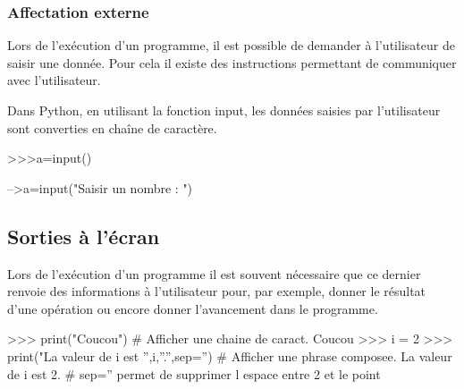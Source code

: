 \documentclass[10pt,fleqn]{article} %
\begin{document}
\subsubsection{Affectation externe}

Lors de l'exécution d'un programme, il est possible de demander à l'utilisateur de saisir une donnée. Pour cela il existe des instructions permettant de communiquer avec l'utilisateur.

\begin{exemple}
\end{exemple}



\begin{minipage}[c]{.4\linewidth}
Dans Python, en utilisant la fonction \textsf{input}, les données saisies par l'utilisateur sont converties en chaîne de caractère.
\begin{py}
\begin{python}
>>>a=input()
\end{python}
\end{py}
\end{minipage}\hfill
\begin{minipage}[c]{.4\linewidth}
\begin{sci}
\begin{scilab}
-->a=input("Saisir un nombre : ")
\end{scilab}
\end{sci}
\end{minipage}

\subsection{Sorties à l'écran}
Lors de l'exécution d'un programme il est souvent nécessaire que ce dernier renvoie des informations à l'utilisateur pour, par exemple, donner le résultat d'une opération ou encore donner l'avancement dans le programme.

\begin{exemple}
\end{exemple}

\begin{minipage}[c]{.95\linewidth}
\begin{py}
\begin{python}
>>> print("Coucou") # Afficher une chaine de caract.
    Coucou
>>> i = 2
>>> print("La valeur de i est '',i,''.'',sep='') # Afficher une phrase composee.
    La valeur de i est 2. # sep='' permet de supprimer l espace entre 2 et le point
\end{python}
\end{py}
\end{minipage}
\end{document}
